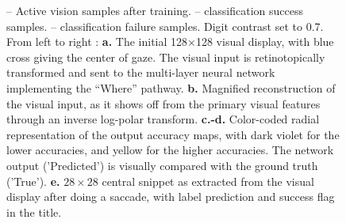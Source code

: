 \begin{figure}[t!]
	\caption{
		{\A-- \E Active vision samples after training}. \A-- \B  classification success samples. \C-- \E classification failure samples. Digit contrast set to 0.7.  From left to right :
		{\bf a.} The initial 128$\times$128 visual display, with blue cross giving the center of gaze.  
		The visual input is retinotopically transformed and sent to the multi-layer neural network implementing the ``Where'' pathway. 
		{\bf b.} Magnified reconstruction of the  visual input, as it shows off from the primary visual features through an inverse log-polar transform. 
		{\bf c.-d.} Color-coded radial representation of the output accuracy maps, with dark violet for the lower accuracies, and yellow for the higher accuracies. The network output ('Predicted') is visually compared with the ground truth ('True'). %
		{\bf e.} $28 \times 28$ central snippet as extracted from the visual display after doing a saccade, with label prediction and success flag in the title. 
		\label{fig:saccades}}%
\end{figure}%

